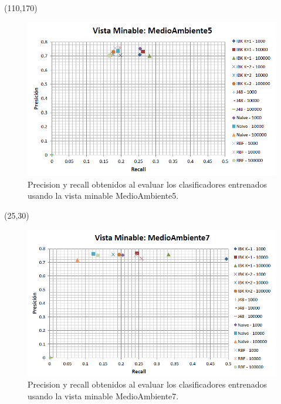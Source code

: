 \documentclass{article}
\begin{document}
\begin{textblock}{80}(110,170)
\begin{figure}[!htb]
\begin{centering}
\includegraphics[scale=0.4]{medioambiente5}
\par\end{centering}
\caption{Precision y recall obtenidos al evaluar los clasificadores entrenados usando la vista minable MedioAmbiente5.}
\label{fig:figura10}
\end{figure}
\end{textblock}
\null
\clearpage

\begin{textblock}{80}(25,30)
\begin{figure}[!htb]
\begin{centering}
\includegraphics[scale=0.4]{medioambiente7}
\par\end{centering}
\caption{Precision y recall obtenidos al evaluar los clasificadores entrenados usando la vista minable MedioAmbiente7.}
\label{fig:figura11}
\end{figure}
\end{textblock}
\end{document}
